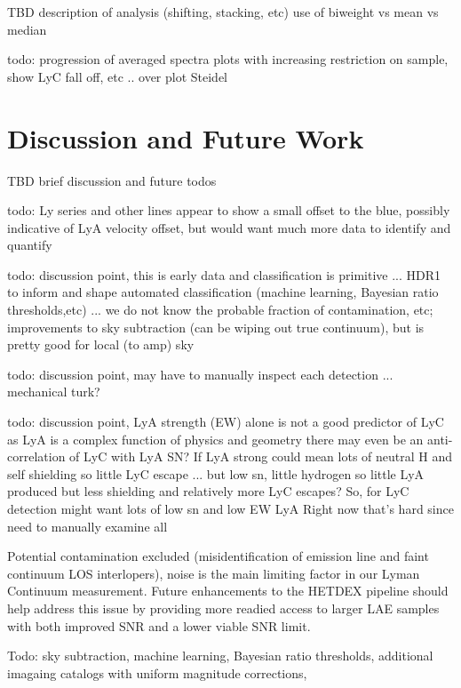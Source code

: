\documentclass{aastex62}
\begin{document}
TBD description of analysis (shifting, stacking, etc) use of biweight vs mean vs median

{ \color{red} todo: progression of averaged spectra plots with increasing restriction on sample, show LyC fall off, etc .. over plot Steidel}




\section{Discussion and Future Work} \label{sec:discussion}
TBD brief discussion and future todos

{ \color{red} todo: Ly series and other lines appear to show a small offset to the blue, possibly indicative of LyA velocity offset, but would want much more data to identify and quantify}

{ \color{red} todo: discussion point, this is early data and classification is primitive ... HDR1 to inform and shape automated classification (machine learning, Bayesian ratio thresholds,etc) ... we do not know the probable fraction of contamination, etc; improvements to sky subtraction (can be wiping out true continuum), but is pretty good for local (to amp) sky}

{ \color{red} todo: discussion point, may have to manually inspect each detection ... mechanical turk?}

{ \color{red} todo: discussion point, LyA strength (EW) alone is not a good predictor of LyC as LyA is a complex function of physics and geometry there may even be an anti-correlation of LyC with LyA SN? If LyA strong could mean lots of neutral H and self shielding so little LyC escape ... but low sn, little hydrogen so little LyA produced but less shielding and relatively more LyC escapes?  So, for LyC detection might want lots of low sn and low EW LyA
Right now that's hard since need to manually examine all }

Potential contamination excluded (misidentification of emission line and faint continuum LOS interlopers), noise is the main limiting factor in our Lyman Continuum measurement. Future enhancements to the HETDEX pipeline should help address this issue by providing more readied access to larger LAE samples with both improved SNR and a lower viable SNR limit.

Todo: sky subtraction, machine learning, Bayesian ratio thresholds, additional imagaing catalogs with uniform magnitude corrections, 

\acknowledgments
\end{document}
